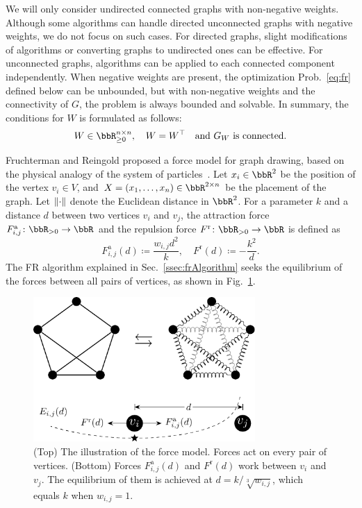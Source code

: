 \documentclass[dvipdfmx,10pt,journal,compsoc]{IEEEtran}
\newcommand{\defeq}{\coloneqq}
\begin{document}
We will only consider undirected connected graphs with non-negative weights.
Although some algorithms can handle directed unconnected graphs with negative weights, we do not focus on such cases.
For directed graphs, slight modifications of algorithms or converting graphs to undirected ones can be effective.
For unconnected graphs, algorithms can be applied to each connected component independently.
When negative weights are present, the optimization Prob.~\eqref{eq:fr} defined below can be unbounded, but with non-negative weights and the connectivity of $G$, the problem is always bounded and solvable.
In summary, the conditions for $W$ is formulated as follows:
\begin{equation}\label{eq:WCondition}
  W \in \bbR_{\geq 0}^{n \times n}, \quad W = W^\top \quad \text{and $G_W$ is connected}.
\end{equation}

Fruchterman and Reingold proposed a force model for graph drawing, based on the physical analogy of the system of particles~\cite{fruchtermanGraphDrawingForcedirected1991}.
Let $x_i \in \bbR^2$ be the position of the vertex $v_i \in V$, and $X = (x_1, \dots, x_n) \in \bbR^{2 \times n}$ be the placement of the graph.
Let $\norm{\cdot}$ denote the Euclidean distance in $\bbR^2$. For a parameter $k$ and a distance $d$ between two vertices $v_i$ and $v_j$, the attraction force $F_{i,j}^\mathrm{a}\colon \bbR_{> 0} \to \bbR$ and the repulsion force $F^\mathrm{r}\colon \bbR_{> 0} \to \bbR$ is defined as
\begin{equation*}
  F_{i,j}^\mathrm{a}(d) \defeq \frac{w_{i,j} d^2}{k}, \quad F^\mathrm{r}(d) \defeq -\frac{k^2}{d}.
\end{equation*}
The FR algorithm explained in Sec.~\ref{ssec:frAlgorithm} seeks the equilibrium of the forces between all pairs of vertices, as shown in Fig.~\ref{fig:frLayout}.

\begin{figure}[t]
  \centering
  \includegraphics[height=5.5cm]{fr_layout/fr_layout.pdf}
  \caption{
    (Top) The illustration of the force model. Forces act on every pair of vertices.
    (Bottom) Forces $F_{i,j}^\mathrm{a}(d)$ and $F^\mathrm{r}(d)$ work between $v_i$ and $v_j$. The equilibrium of them is achieved at $d = k/\sqrt[3]{w_{i,j}}$, which equals $k$ when $w_{i,j} = 1$.
  }
  \label{fig:frLayout}
\end{figure}
\end{document}
